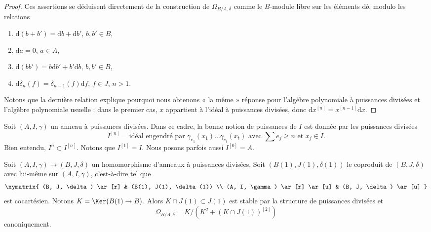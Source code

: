 \begin{proof}
Ces assertions se déduisent directement de la construction de $\Omega_{B/A, \delta}$
comme le $B$-module libre sur les éléments $\text{d}b$, modulo les relations
\begin{enumerate}
\item $\text{d}(b + b') = \text{d}b + \text{d}b'$, $b, b' \in B$,
\item $\text{d}a = 0$, $a \in A$,
\item $\text{d}(bb') = b \text{d}b' + b' \text{d}b$, $b, b' \in B$,
\item $\text{d}\delta_n(f) = \delta_{n - 1}(f)\text{d}f$, $f \in J$, $n > 1$.
\end{enumerate}
Notons que la dernière relation explique pourquoi nous obtenons « la même » réponse pour
l'algèbre polynomiale à puissances divisées et l'algèbre polynomiale usuelle :
dans le premier cas, $x$ appartient à l'idéal à puissances divisées, donc
$\text{d}x^{[n]} = x^{[n - 1]}\text{d}x$.
\end{proof}

\noindent
Soit $(A, I, \gamma)$ un anneau à puissances divisées. Dans ce cadre, la
bonne notion de puissances de $I$ est donnée par les puissances divisées
$$
I^{[n]} = \text{idéal engendré par }
\gamma_{e_1}(x_1) \ldots \gamma_{e_t}(x_t)
\text{ avec }\sum e_j \geq n\text{ et }x_j \in I.
$$
Bien entendu, $I^n \subset I^{[n]}$. Notons que $I^{[1]} = I$.
Nous posons parfois aussi $I^{[0]} = A$.

\begin{lemma}
\label{lemma-diagonal-and-differentials}
Soit $(A, I, \gamma) \to (B, J, \delta)$ un homomorphisme
d'anneaux à puissances divisées. Soit $(B(1), J(1), \delta(1))$ le coproduit
de $(B, J, \delta)$ avec lui-même sur $(A, I, \gamma)$, c'est-à-dire
tel que
$$
\xymatrix{
(B, J, \delta) \ar[r] & (B(1), J(1), \delta(1)) \\
(A, I, \gamma) \ar[r] \ar[u] & (B, J, \delta) \ar[u]
}
$$
est cocartésien. Notons $K = \Ker(B(1) \to B)$.
Alors $K \cap J(1) \subset J(1)$ est stable par la structure de
puissances divisées et
$$
\Omega_{B/A, \delta} = K/ \left(K^2 + (K \cap J(1))^{[2]}\right)
$$
canoniquement.
\end{lemma}

